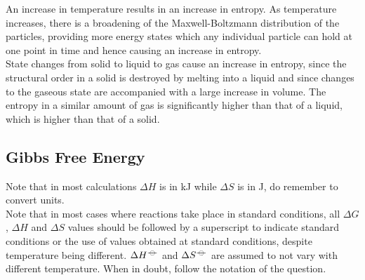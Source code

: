 \documentclass[../main]{subfiles}
\begin{document}

	An increase in temperature results in an increase in entropy. As temperature increases, there is a broadening of the Maxwell-Boltzmann distribution of the particles, providing more energy states which any individual particle can hold at one point in time and hence causing an increase in entropy. \\

	State changes from solid to liquid to gas cause an increase in entropy, since the structural order in a solid is destroyed by melting into a liquid and since changes to the gaseous state are accompanied with a large increase in volume. The entropy in a similar amount of gas is significantly higher than that of a liquid, which is higher than that of a solid.

	\subsection{Gibbs Free Energy}



	Note that in most calculations \(\Delta H\) is in \si{\kJ} while \(\Delta S\) is in \si{J}, do remember to convert units. \\

	Note that in most cases where reactions take place in standard conditions, all \(\Delta G\), \(\Delta H\) and \(\Delta S\) values should be followed by a superscript \plimsoll to indicate standard conditions or the use of values obtained at standard conditions, despite temperature being different. \(\Delta H^{-\kern-4pt{\ominus}\kern-4pt-}\) and \(\Delta S^{-\kern-4pt{\ominus}\kern-4pt-}\) are assumed to not vary with different temperature. When in doubt, follow the notation of the question.
\end{document}
